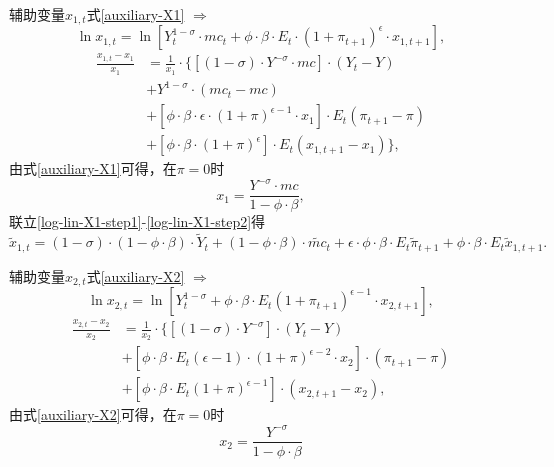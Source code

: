 辅助变量$x_{1,t}$式\eqref{auxiliary-X1} $\Rightarrow$
\begin{equation*}
  \ln x_{1,t} = \ln \left[ Y_t^{1-\sigma} \cdot mc_t + \phi \cdot \beta \cdot E_t \cdot (1+\pi_{t+1})^{\epsilon} \cdot x_{1,t+1}\right],
\end{equation*}
\begin{align}
\label{log-lin-X1-step1}
  \frac{x_{1,t} - x_{1}}{x_1} &= \frac{1}{x_1} \cdot \{ \left[(1-\sigma) \cdot Y^{-\sigma} \cdot mc \right]\cdot (Y_t - Y) \nonumber\\
                              &+Y^{1-\sigma} \cdot (mc_t - mc) \nonumber\\
                              &+\left[\phi \cdot \beta \cdot \epsilon \cdot (1+\pi)^{\epsilon -1} \cdot x_1\right] \cdot E_t (\pi_{t+1}-\pi)\nonumber\\
                              &+\left[ \phi \cdot \beta \cdot (1+\pi)^{\epsilon}\right] \cdot E_t (x_{1,t+1} - x_1) \},
\end{align}
由式\eqref{auxiliary-X1}可得，在$\pi = 0$时
\begin{equation}
\label{log-lin-X1-step2}
  x_{1} = \frac{Y^{-\sigma} \cdot mc}{1-\phi \cdot \beta},
\end{equation}
联立\eqref{log-lin-X1-step1}-\eqref{log-lin-X1-step2}得
\begin{equation}
\label{log-lin-X1-step3}
  \tilde{x}_{1,t} = (1-\sigma) \cdot (1-\phi \cdot \beta) \cdot \tilde{Y}_t + (1-\phi \cdot \beta) \cdot \tilde{mc}_t + \epsilon \cdot \phi \cdot \beta \cdot E_t \tilde{\pi}_{t+1} + \phi \cdot \beta \cdot E_t \tilde{x}_{1,t+1}.
\end{equation}

辅助变量$x_{2,t}$式\eqref{auxiliary-X2} $\Rightarrow$
\begin{equation*}
  \ln x_{2,t} = \ln \left[Y_t^{1-\sigma} + \phi \cdot \beta \cdot E_t \left(1+\pi_{t+1}\right)^{\epsilon -1} \cdot x_{2,t+1}\right],
\end{equation*}
\begin{align}
\label{eq:log-lin-X2-step1}
  \frac{x_{2,t}-x_2}{x_2} &= \frac{1}{x_2} \cdot \{ \left[(1-\sigma) \cdot Y^{-\sigma}\right] \cdot (Y_t - Y)\nonumber\\
                          &+\left[\phi \cdot \beta \cdot E_t (\epsilon -1) \cdot (1+\pi)^{\epsilon -2} \cdot x_2\right] \cdot (\pi_{t+1} - \pi)\nonumber\\
                          &+\left[\phi \cdot \beta \cdot E_t (1+\pi)^{\epsilon -1} \right] \cdot \left( x_{2,t+1} - x_2\right),
\end{align}
由式\eqref{auxiliary-X2}可得，在$\pi = 0$时
\begin{equation}
  \label{eq:log-lin-X2-step2}
  x_2 = \frac{Y^{-\sigma}}{1-\phi \cdot \beta}
\end{equation}

